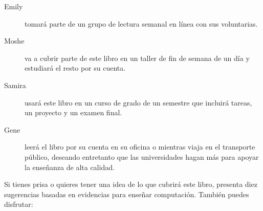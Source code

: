 \begin{description}

\item[Emily]
 tomará parte de un grupo de lectura semanal en línea con sus voluntarias.

\item[Moshe]
 va a cubrir parte de este libro en un taller de fin de semana de un día y estudiará el resto por su cuenta. 

\item[Samira]
 usará este libro en un curso de grado de un semestre que incluirá tareas, un proyecto y un examen final. 

\item[Gene]
 leerá el libro por su cuenta en su oficina o mientras viaja en el transporte público, deseando entretanto que las universidades hagan más para apoyar la enseñanza de alta calidad. 

\end{description}

Si tienes prisa o quieres tener una idea de lo que cubrirá este libro,
\cite{Brow2018} presenta diez sugerencias basadas en evidencias para enseñar computación.
También puedes disfrutar:

